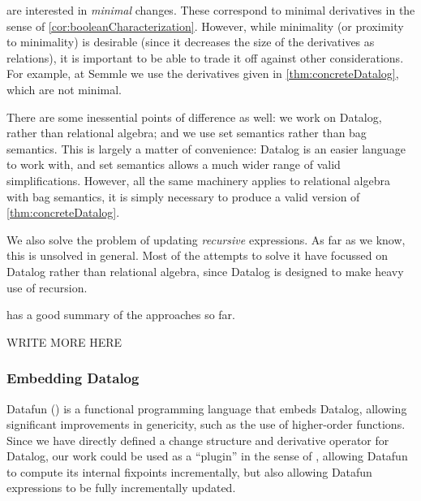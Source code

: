 \citeauthor{griffin1997improved} are interested in \emph{minimal} changes. These correspond to
minimal derivatives in the sense of \cref{cor:booleanCharacterization}. However,
while minimality (or proximity to minimality) is desirable (since it decreases
the size of the derivatives as relations), it is important to be able to trade
it off against other considerations. For example, at
Semmle we use the derivatives given in \cref{thm:concreteDatalog}, which are not minimal.

There are some inessential points of difference as well: we work on Datalog,
rather than relational algebra; and we use set semantics rather than bag
semantics. This is largely a matter of convenience: Datalog is an easier
language to work with, and set semantics allows a much wider range of valid
simplifications. However, all the same machinery applies to relational algebra
with bag semantics, it is simply necessary to produce a valid version of \cref{thm:concreteDatalog}.

We also solve the problem of updating \emph{recursive} expressions. As far as we
know, this is unsolved in general. Most of the attempts to solve it have
focussed on Datalog rather than relational algebra, since Datalog is designed to
make heavy use of recursion. 

\textcite{gupta1995maintenance} has a good summary of the approaches so far.

WRITE MORE HERE

\subsubsection{Embedding Datalog}
\label{sec:embeddingDatalog}

Datafun (\textcite{arntz2016datafun}) is a functional programming language that embeds
Datalog, allowing significant improvements in genericity, such as the use of
higher-order functions. Since we have directly defined a change structure and
derivative operator for Datalog, our work could be used as a ``plugin'' in the sense
of \citeauthor{cai2014changes}, allowing Datafun to compute its internal fixpoints
incrementally, but also allowing Datafun expressions to be fully incrementally updated.

\printbibliography


